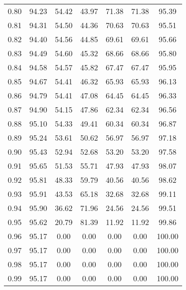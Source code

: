 \begin{tabular}{|c|c|c|c|c|c|c|}
      0.80 &     94.23 &     54.42 &      43.97 &   71.38 &      71.38 &         95.39 \\
      0.81 &     94.31 &     54.50 &      44.36 &   70.63 &      70.63 &         95.51 \\
      0.82 &     94.40 &     54.56 &      44.85 &   69.61 &      69.61 &         95.66 \\
      0.83 &     94.49 &     54.60 &      45.32 &   68.66 &      68.66 &         95.80 \\
      0.84 &     94.58 &     54.57 &      45.82 &   67.47 &      67.47 &         95.95 \\
      0.85 &     94.67 &     54.41 &      46.32 &   65.93 &      65.93 &         96.13 \\
      0.86 &     94.79 &     54.41 &      47.08 &   64.45 &      64.45 &         96.33 \\
      0.87 &     94.90 &     54.15 &      47.86 &   62.34 &      62.34 &         96.56 \\
      0.88 &     95.10 &     54.33 &      49.41 &   60.34 &      60.34 &         96.87 \\
      0.89 &     95.24 &     53.61 &      50.62 &   56.97 &      56.97 &         97.18 \\
      0.90 &     95.43 &     52.94 &      52.68 &   53.20 &      53.20 &         97.58 \\
      0.91 &     95.65 &     51.53 &      55.71 &   47.93 &      47.93 &         98.07 \\
      0.92 &     95.81 &     48.33 &      59.79 &   40.56 &      40.56 &         98.62 \\
      0.93 &     95.91 &     43.53 &      65.18 &   32.68 &      32.68 &         99.11 \\
      0.94 &     95.90 &     36.62 &      71.96 &   24.56 &      24.56 &         99.51 \\
      0.95 &     95.62 &     20.79 &      81.39 &   11.92 &      11.92 &         99.86 \\
      0.96 &     95.17 &      0.00 &       0.00 &    0.00 &       0.00 &        100.00 \\
      0.97 &     95.17 &      0.00 &       0.00 &    0.00 &       0.00 &        100.00 \\
      0.98 &     95.17 &      0.00 &       0.00 &    0.00 &       0.00 &        100.00 \\
      0.99 &     95.17 &      0.00 &       0.00 &    0.00 &       0.00 &        100.00 \\
\bottomrule
\end{tabular}
